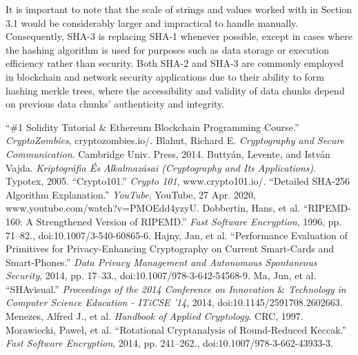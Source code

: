 \documentclass[12pt]{extarticle}
\begin{document}
It is important to note that the scale of strings and values worked with in Section 3.1 would be considerably larger and impractical to handle manually. Consequently, SHA-3 is replacing SHA-1 whenever possible, except in cases where the hashing algorithm is used for purposes such as data storage or execution efficiency rather than security. Both SHA-2 and SHA-3 are commonly employed in blockchain and network security applications due to their ability to form hashing merkle trees, where the accessibility and validity of data chunks depend on previous data chunks' authenticity and integrity.\cite{src5}\cite{src8}\cite{src10}

\pagebreak
\begin{thebibliography}{}
“\#1 Solidity Tutorial $\&$ Ethereum Blockchain Programming Course.” \textit{CryptoZombies}, cryptozombies.io/. 
Blahut, Richard E. \textit{Cryptography and Secure Communication}. Cambridge Univ. Press, 2014. 
Buttyán, Levente, and István Vajda. \textit{Kriptográfia És Alkalmazásai (Cryptography and Its Applications)}. Typotex, 2005. 
“Crypto101.” \textit{Crypto 101}, www.crypto101.io/. 
“Detailed SHA-256 Algorithm Explanation.” \textit{YouTube}, YouTube, 27 Apr. 2020, www.youtube.com/watch?v=PMOEdd4yzyU. 
Dobbertin, Hans, et al. “RIPEMD-160: A Strengthened Version of RIPEMD.” \textit{Fast Software Encryption}, 1996, pp. 71–82., doi:10.1007/3-540-60865-6. 
Hajny, Jan, et al. “Performance Evaluation of Primitives for Privacy-Enhancing Cryptography on Current Smart-Cards and Smart-Phones.” \textit{Data Privacy Management and Autonomous Spontaneous Security}, 2014, pp. 17–33.,
doi:10.1007/978-3-642-54568-9. 
Ma, Jun, et al. “SHAvisual.” \textit{Proceedings of the 2014 Conference on Innovation $\&$ Technology in Computer Science Education - ITiCSE '14}, 2014, doi:10.1145/2591708.2602663. 
Menezes, Alfred J., et al. \textit{Handbook of Applied Cryptology}. CRC, 1997. 
Morawiecki, Paweł, et al. “Rotational Cryptanalysis of Round-Reduced Keccak.” \textit{Fast Software Encryption}, 2014, pp. 241–262., doi:10.1007/978-3-662-43933-3. 
\end{thebibliography}
\end{document}
